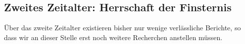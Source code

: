 \subsection{Zweites Zeitalter: Herrschaft der Finsternis}
\par Über das zweite Zeitalter existieren bisher nur wenige verlässliche Berichte, so
dass wir an dieser Stelle erst noch weitere Recherchen anstellen müssen.
